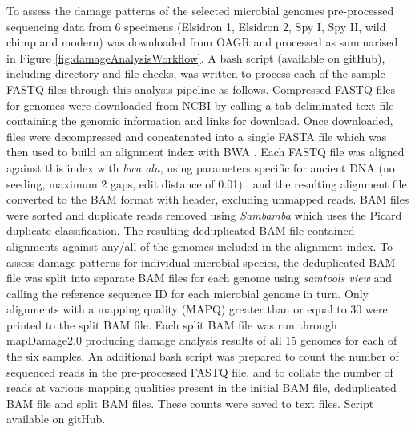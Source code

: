 \documentclass[12pt, a4paper]{article}
\begin{document}
To assess the damage patterns of the selected microbial genomes pre-processed sequencing data from 6 specimens (Elsidron 1, Elsidron 2, Spy I, Spy II, wild chimp and modern) was downloaded from OAGR and processed as summarised in Figure \ref{fig:damageAnalysisWorkflow}.
A bash script (available on gitHub), including directory and file checks, was written to process each of the sample FASTQ files through this analysis pipeline as follows. 
Compressed FASTQ files for genomes were downloaded from NCBI by calling a tab-deliminated text file containing the genomic information and links for download. 
Once downloaded, files were decompressed and concatenated into a single FASTA file which was then used to build an alignment index with BWA \cite{Li:2009aa}. 
Each FASTQ file was aligned against this index with \textit{bwa aln}, using parameters specific for ancient DNA (no seeding, maximum 2 gaps, edit distance of 0.01) \cite{Schubert:2012aa}, and the resulting alignment file converted to the BAM format with header, excluding unmapped reads. 
BAM files were sorted and duplicate reads removed using \textit{Sambamba} \cite{Tarasov:2015aa} which uses the Picard duplicate classification. 
The resulting deduplicated BAM file contained alignments against any/all of the genomes included in the alignment index. 
To assess damage patterns for individual microbial species, the deduplicated BAM file was split into separate BAM files for each genome using \textit{samtools view} \cite{Li:2009ab} and calling the reference sequence ID for each microbial genome in turn. 
Only alignments with a mapping quality (MAPQ) greater than or equal to 30 were printed to the split BAM file. 
Each split BAM file was run through mapDamage2.0 \cite{Jonsson:2013aa} producing damage analysis results of all 15 genomes for each of the six samples. 
An additional bash script was prepared to count the number of sequenced reads in the pre-processed FASTQ file, and to collate the number of reads at various mapping qualities present in the initial BAM file, deduplicated BAM file and split BAM files. 
These counts were saved to text files. 
Script available on gitHub.
\end{document}
